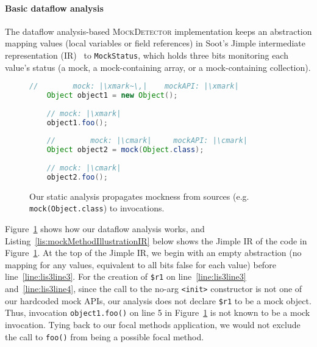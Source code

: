 \paragraph{Basic dataflow analysis} The dataflow analysis-based \textsc{MockDetector} implementation keeps an abstraction mapping values (local variables or field references) in Soot's Jimple intermediate representation (IR)~\cite{Vallee-Rai:1999:SJB:781995.782008} to \texttt{MockStatus}, which holds three bits monitoring each value's status (a mock, a mock-containing array, or a mock-containing collection). %

\begin{figure}
\begin{lstlisting}[basicstyle=\ttfamily,
basicstyle=\scriptsize\ttfamily,language = Java, framesep=4.5mm, framexleftmargin=1.0mm, captionpos=b, escapechar=|, morekeywords={@Test}]
	//        mock: |\xmark~\,|    mockAPI: |\xmark|
	Object object1 = new Object();
	
	// mock: |\xmark|
	object1.foo();
	
	//        mock: |\cmark|     mockAPI: |\cmark|
	Object object2 = mock(Object.class);
	
	// mock: |\cmark|
	object2.foo();
\end{lstlisting}
    
    \caption{Our static analysis propagates mockness from sources (e.g. \texttt{mock(Object.class}) to invocations.}
    \label{fig:mockMethodIllustration}
    
\end{figure}

Figure~\ref{fig:mockMethodIllustration} shows how our dataflow analysis works, and Listing~\ref{lis:mockMethodIllustrationIR} below shows the Jimple IR of the code in Figure~\ref{fig:mockMethodIllustration}. At the top of the Jimple IR, we begin with an empty abstraction (no mapping for any values, equivalent to all bits false for each value) before line~\ref{line:lis3line3}. For the creation of \texttt{\$r1} on line~\ref{line:lis3line3} and~\ref{line:lis3line4}, since the call to the no-arg \texttt{<init>} constructor is not one of our hardcoded mock APIs, our analysis does not declare \texttt{\$r1} to be a mock object. 
Thus, invocation \texttt{object1.foo()} on line 5 in Figure~\ref{fig:mockMethodIllustration} is not known to be a mock invocation. Tying back to our focal methods application, we would not exclude the call to \texttt{foo()} from being a possible focal method.

